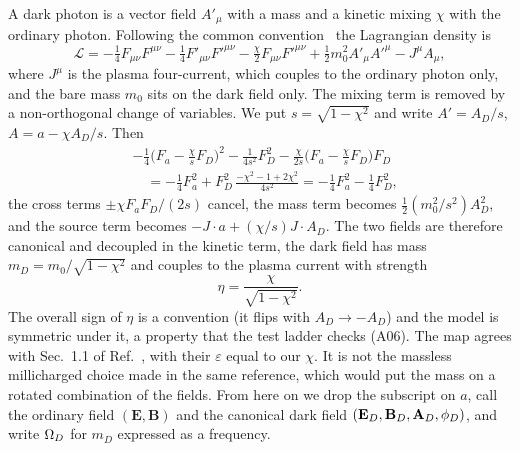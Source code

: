 A dark photon is a vector field $A'_\mu$ with a mass and a kinetic mixing $\chi$ with the ordinary photon. Following the common convention~\cite{Fabbrichesi2020} the Lagrangian density is
\begin{equation}
\mathcal L=-\tfrac14F_{\mu\nu}F^{\mu\nu}-\tfrac14F'_{\mu\nu}F'^{\mu\nu}-\tfrac{\chi}{2}F_{\mu\nu}F'^{\mu\nu}+\tfrac12m_0^2A'_\mu A'^\mu-J^\mu A_\mu ,
\label{eq:lag}
\end{equation}
where $J^\mu$ is the plasma four-current, which couples to the ordinary photon only, and the bare mass $m_0$ sits on the dark field only. The mixing term is removed by a non-orthogonal change of variables. We put $s=\sqrt{1-\chi^2}$ and write $A'=A_D/s$, $A=a-\chi A_D/s$. Then
\begin{align}
&-\tfrac14\Big(F_a-\tfrac{\chi}{s}F_D\Big)^2-\tfrac{1}{4s^2}F_D^2-\tfrac{\chi}{2s}\Big(F_a-\tfrac{\chi}{s}F_D\Big)F_D\nonumber\\
&\quad=-\tfrac14F_a^2+F_D^2\,\frac{-\chi^2-1+2\chi^2}{4s^2}
=-\tfrac14F_a^2-\tfrac14F_D^2 ,
\end{align}
the cross terms $\pm\chi F_aF_D/(2s)$ cancel, the mass term becomes $\tfrac12(m_0^2/s^2)A_D^2$, and the source term becomes $-J\cdot a+(\chi/s)J\cdot A_D$. The two fields are therefore canonical and decoupled in the kinetic term, the dark field has mass $m_D=m_0/\sqrt{1-\chi^2}$ and couples to the plasma current with strength
\begin{equation}
\eta=\frac{\chi}{\sqrt{1-\chi^2}} .
\label{eq:eta}
\end{equation}
The overall sign of $\eta$ is a convention (it flips with $A_D\to-A_D$) and the model is symmetric under it, a property that the test ladder checks (A06). The map agrees with Sec.~1.1 of Ref.~\cite{Fabbrichesi2020}, with their $\varepsilon$ equal to our $\chi$. It is not the massless millicharged choice made in the same reference, which would put the mass on a rotated combination of the fields. From here on we drop the subscript on $a$, call the ordinary field $(\mathbf E,\mathbf B)$ and the canonical dark field $(\mathbf{E}_D,\mathbf{B}_D,\mathbf{A}_D,\phi_D)$, and write $\Omega_D$ for $m_D$ expressed as a frequency.

